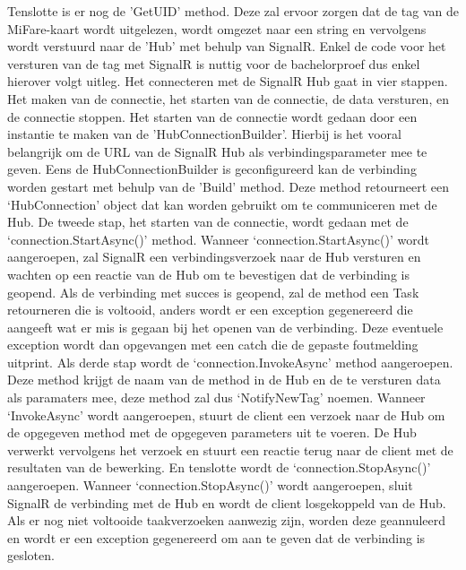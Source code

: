 Tenslotte is er nog de 'GetUID’ method. Deze zal ervoor zorgen dat de tag van de MiFare-kaart wordt uitgelezen, wordt omgezet naar een string en vervolgens wordt verstuurd naar de 'Hub’ met behulp van SignalR. Enkel de code voor het versturen van de tag met SignalR is nuttig voor de bachelorproef dus enkel hierover volgt uitleg. Het connecteren met de SignalR Hub gaat in vier stappen. Het maken van de connectie, het starten van de connectie, de data versturen, en de connectie stoppen. Het starten van de connectie wordt gedaan door een instantie te maken van de 'HubConnectionBuilder'. Hierbij is het vooral belangrijk om de URL van de SignalR Hub als verbindingsparameter mee te geven. Eens de HubConnectionBuilder is geconfigureerd kan de verbinding worden gestart met behulp van de 'Build’ method. Deze method retourneert een ‘HubConnection’ object dat kan worden gebruikt om te communiceren met de Hub. De tweede stap, het starten van de connectie, wordt gedaan met de ‘connection.StartAsync()’ method. Wanneer ‘connection.StartAsync()’ wordt aangeroepen, zal SignalR een verbindingsverzoek naar de Hub versturen en wachten op een reactie van de Hub om te bevestigen dat de verbinding is geopend. Als de verbinding met succes is geopend, zal de method een Task retourneren die is voltooid, anders wordt er een exception gegenereerd die aangeeft wat er mis is gegaan bij het openen van de verbinding. Deze eventuele exception wordt dan opgevangen met een catch die de gepaste foutmelding uitprint. Als derde stap wordt de ‘connection.InvokeAsync’ method aangeroepen. Deze method krijgt de naam van de method in de Hub en de te versturen data als paramaters mee, deze method zal dus ‘NotifyNewTag’ noemen. Wanneer ‘InvokeAsync’ wordt aangeroepen, stuurt de client een verzoek naar de Hub om de opgegeven method met de opgegeven parameters uit te voeren. De Hub verwerkt vervolgens het verzoek en stuurt een reactie terug naar de client met de resultaten van de bewerking. En tenslotte wordt de ‘connection.StopAsync()’ aangeroepen. Wanneer ‘connection.StopAsync()’ wordt aangeroepen, sluit SignalR de verbinding met de Hub en wordt de client losgekoppeld van de Hub. Als er nog niet voltooide taakverzoeken aanwezig zijn, worden deze geannuleerd en wordt er een exception gegenereerd om aan te geven dat de verbinding is gesloten.


